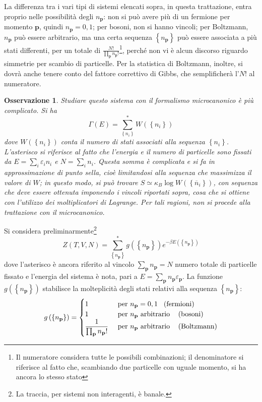 \documentclass[11pt, a4paper]{scrartcl}
\theoremstyle{style}
\newtheorem{osservazione}{Osservazione}[section]
\theoremstyle{style1}
\numberwithin{equation}{subsection}
\begin{document}
La differenza tra i vari tipi di sistemi elencati sopra, in questa trattazione, entra proprio nelle possibilit\`a degli $n_\mathbf{p} $: non si pu\`o avere pi\`u di un fermione per momento $\mathbf{p} $, quindi $n_\mathbf{p} = 0, 1$; per bosoni, non si hanno vincoli; per Boltzmann, $n_\mathbf{p} $ pu\`o essere arbitrario, ma una certa sequenza $\left\{ n_\mathbf{p}  \right\} $ pu\`o essere associata a pi\`u stati differenti, per un totale di $\frac{N!}{\prod_\mathbf{p} n_\mathbf{p} !}$\footnote{Il numeratore considera tutte le possibili combinazioni; il denominatore si riferisce al fatto che, scambiando due particelle con uguale momento, si ha ancora lo stesso stato}, perch\'e non vi \`e alcun discorso riguardo simmetrie per scambio di particelle.
Per la statistica di Boltzmann, inoltre, si dovr\`a anche tenere conto del fattore correttivo di Gibbs, che semplificher\`a l'$N!$ al numeratore.
\begin{osservazione}
Studiare questo sistema con il formalismo microcanonico \`e pi\`u complicato.
Si ha 
\[
\Gamma(E) = \sum_{\left\{ n_i \right\} }^{*} W \left(\left\{ n_i \right\} \right) 
\] 
dove $W\left(\left\{ n_i \right\} \right) $ conta il numero di stati associati alla sequenza $\left\{ n_i \right\} $.
L'asterisco si riferisce al fatto che l'energia e il numero di particelle sono fissati da $E = \sum_{i}^{} \varepsilon _i n_i$ e $N = \sum_{i}^{} n_i$. 
Questa somma \`e complicata e si fa in approssimazione di punto sella, cio\`e limitandosi alla sequenza che massimizza il valore di $W$; in questo modo, si pu\`o trovare $S\simeq \kappa _B \log W\left(\left\{ \overline{n}_i \right\} \right) $, con sequenza che deve essere ottenuta imponendo i vincoli riportati sopra, cosa che si ottiene con l'utilizzo dei moltiplicatori di Lagrange.
Per tali ragioni, non si procede alla trattazione con il microcanonico.
\end{osservazione}
\noindent Si considera preliminarmente\footnote{La traccia, per sistemi non interagenti, \`e banale.}
\[
Z(T,V,N) = \sum_{\left\{ n_\mathbf{p}  \right\} }^{*} g\left(\left\{ n_\mathbf{p}  \right\} \right) e^{-\beta E\left(\left\{ n_\mathbf{p}  \right\} \right) }
\] 
dove l'asterisco \`e ancora riferito al vincolo $\sum_{\mathbf{p} }^{} n_\mathbf{p}  = N$ numero totale di particelle fissato e l'energia del sistema \`e nota, pari a $E = \sum_{\mathbf{p} }^{} n_\mathbf{p} \varepsilon _\mathbf{p} $.
La funzione $g\left(\left\{ n_\mathbf{p}  \right\} \right) $ stabilisce la molteplicit\`a degli stati relativi alla sequenza $\left\{ n_\mathbf{p}  \right\} $:
\[
g\left(\left\{ n_\mathbf{p}  \right\} \right)  = \begin{cases}
	1 & \text{ per } n_\mathbf{p} = 0,1 \hspace{.3cm} \text{(fermioni)}\\
	1 & \text{ per } n_\mathbf{p} \text{ arbitrario } \hspace{.3cm} \text{(bosoni)}\\
        \displaystyle \frac{1}{\prod_\mathbf{p} n_\mathbf{p} !}& \text{ per } n_\mathbf{p} \text{ arbitrario } \hspace{.3cm}\text{(Boltzmann)}
\end{cases} 
\] 
\end{document}
